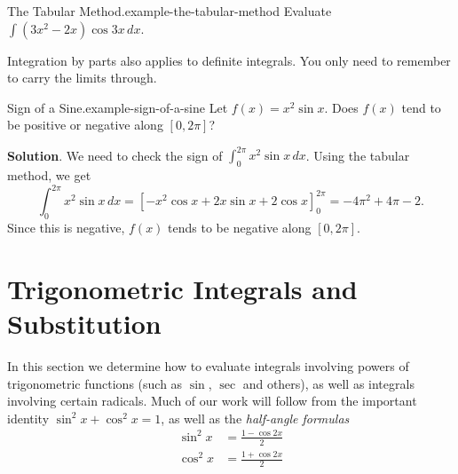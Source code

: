 \documentclass[10pt,]{book}
\numberwithin{equation}{section}
\begin{document}
\begin{example}{The Tabular Method.}{example-the-tabular-method}%
\hypertarget{p-515}{}%
Evaluate \(\int (3x^{2} - 2x)\cos3x\,dx\).%
\end{example}
\hypertarget{p-516}{}%
Integration by parts also applies to definite integrals. You only need to remember to carry the limits through.%
\begin{example}{Sign of a Sine.}{example-sign-of-a-sine}%
\hypertarget{p-517}{}%
Let \(f(x) = x^{2}\sin x\). Does \(f(x)\) tend to be positive or negative along \([0,2\pi]\)?%
\par\smallskip%
\noindent\textbf{Solution}.\hypertarget{solution-113}{}\quad%
\hypertarget{p-518}{}%
We need to check the sign of \(\int_{0}^{2\pi}x^{2}\sin x\,dx\). Using the tabular method, we get%
\begin{equation*}
\int_{0}^{2\pi}x^{2}\sin x\,dx = [-x^{2}\cos x + 2x\sin x + 2\cos x]_{0}^{2\pi} = -4\pi^{2} + 4\pi - 2.
\end{equation*}
Since this is negative, \(f(x)\) tends to be negative along \([0,2\pi]\).%
\end{example}
%
%
\typeout{************************************************}
\typeout{************************************************}
%
\section[{Trigonometric Integrals and Substitution}]{Trigonometric Integrals and Substitution}\label{section-trigonometric-integrals-and-substitution}
\begin{introduction}{}%
\hypertarget{p-519}{}%
In this section we determine how to evaluate integrals involving powers of trigonometric functions (such as \(\sin\), \(\sec\) and others), as well as integrals involving certain radicals. Much of our work will follow from the important identity \(\sin^{2}x + \cos^{2}x = 1\), as well as the \emph{half-angle formulas}%
\begin{align*}
\sin^{2}x & = \frac{1 - \cos2x}{2} \\
\cos^{2}x & = \frac{1 + \cos2x}{2} 
\end{align*}
%
\end{introduction}%
%
%
\typeout{************************************************}
\typeout{************************************************}
%
\end{document}
